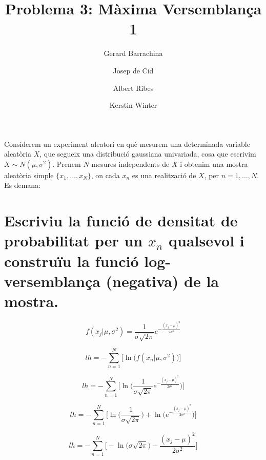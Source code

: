 \documentclass[a4paper,10pt]{article}
\title{Problema 3: Màxima Versemblança 1}
\author{
Gerard Barrachina
\and
Josep de Cid
\and
Albert Ribes
\and
Kerstin Winter
}
\begin{document}
\maketitle

%


Considerem un experiment aleatori en què mesurem una determinada variable aleatòria $X$,
que segueix
una distribució gaussiana univariada, cosa que escrivim $X \sim N(\mu, \sigma^2)$. Prenem $N$
mesures independents de $X$ i obtenim una mostra aleatòria simple $\{x_1, \dots, x_N\}$,
on cada $x_n$ es una realització de $X$, per $n = 1,\dots,N$. Es demana:

\section{Escriviu la funció de densitat de probabilitat per un $x_n$ qualsevol i construïu la funció log-versemblança (negativa) de la mostra.}

\begin{equation*}
f(x_j | \mu, \sigma^2) = \frac{1}{\sigma\sqrt{2\pi}}e^{-\frac{(x_j - \mu)^2}{2\sigma^2}}
\end{equation*}

\begin{equation*}
lh = - \sum_{n = 1}^{N} \Big[ \ln{\big( f(x_n | \mu, \sigma^2)\big)} \Big]
\end{equation*}

\begin{equation*}
lh = - \sum_{n = 1}^{N} \Big[ \ln{\Big(  \frac{1}{\sigma\sqrt{2\pi}}e^{-\frac{(x_j - \mu)^2}{2\sigma^2}} \Big)} \Big]
\end{equation*}

\begin{equation*}
lh = - \sum_{n = 1}^{N} \Big[ \ln{\Big(  \frac{1}{\sigma\sqrt{2\pi}}\Big)} + \ln{\Big(e^{-\frac{(x_j - \mu)^2}{2\sigma^2}} \Big)} \Big]
\end{equation*}

\begin{equation*}
lh = - \sum_{n = 1}^{N} \Big[ -\ln{\big(  \sigma\sqrt{2\pi} \big)} - \frac{(x_j - \mu)^2}{2\sigma^2} \Big]
\end{equation*}
\end{document}
